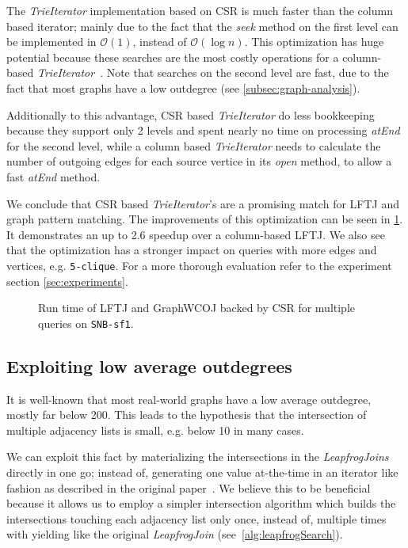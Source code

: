 The \textit{TrieIterator} implementation based on \textsc{CSR} is much faster than the column based iterator; mainly due to the fact
that the \textit{seek} method on the first level can be implemented in $\mathcal{O}(1)$, instead of $\mathcal{O}(\log n)$.
This optimization has huge potential because these searches are the most costly operations for a column-based
\textit{TrieIterator}~\cite{myria-detailed}.
Note that searches on the second level are fast, due to the fact that most graphs have a low outdegree (see
\cref{subsec:graph-analysis}).

Additionally to this advantage, \textsc{CSR} based \textit{TrieIterator} do less bookkeeping because they support only 2 levels and spent
nearly no time on processing \textit{atEnd} for the second level, while a column based \textit{TrieIterator} needs to calculate the
number of outgoing edges for each source vertice in its \textit{open} method, to allow a fast \textit{atEnd} method.

We conclude that \textsc{CSR} based \textit{TrieIterator}'s are a promising match for \textsc{LFTJ} and graph pattern matching.
The improvements of this optimization can be seen in \cref{fig:wcoj-vs-graphWCOJ}.
It demonstrates an up to 2.6 speedup over a column-based \textsc{LFTJ}. %
We also see that the optimization has a stronger impact on queries with more edges and vertices, e.g. \texttt{5-clique}.
For a more thorough evaluation refer to the experiment section \ref{sec:experiments}.

\begin{figure}
    \centering
    
    \caption{Run time of \textsc{LFTJ} and GraphWCOJ backed by \textsc{CSR} for multiple queries on \texttt{SNB-sf1}.}
    \label{fig:wcoj-vs-graphWCOJ}
\end{figure}

\subsection{Exploiting low average outdegrees} \label{subsec:graphWCOJ-materalization}

It is well-known that most real-world graphs have a low average outdegree, mostly far below 200.
This leads to the hypothesis that the intersection of multiple adjacency lists is small, e.g. below 10 in many cases.

We can exploit this fact by materializing the intersections in the \textit{LeapfrogJoins} directly
in one go; instead of, generating one value at-the-time in an iterator like fashion as described in the
original paper~\cite{lftj}.
We believe this to be beneficial because it allows us to employ a simpler intersection algorithm which builds
the intersections touching each adjacency list only once, instead of, multiple times with yielding like the original
\textit{LeapfrogJoin} (see~\cref{alg:leapfrogSearch}).


